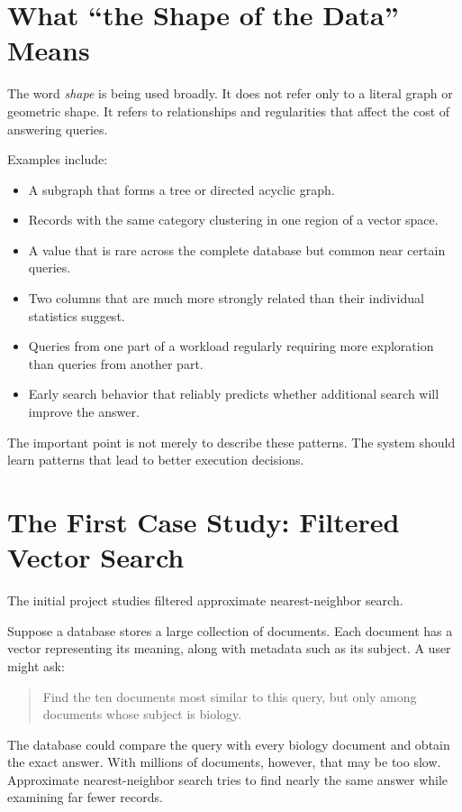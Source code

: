 \documentclass[11pt]{article}
\begin{document}
\section{What ``the Shape of the Data'' Means}

The word \emph{shape} is being used broadly. It does not refer only to a literal graph or geometric shape. It refers to relationships and regularities that affect the cost of answering queries.

Examples include:

\begin{itemize}
    \item A subgraph that forms a tree or directed acyclic graph.
    \item Records with the same category clustering in one region of a vector space.
    \item A value that is rare across the complete database but common near certain queries.
    \item Two columns that are much more strongly related than their individual statistics suggest.
    \item Queries from one part of a workload regularly requiring more exploration than queries from another part.
    \item Early search behavior that reliably predicts whether additional search will improve the answer.
\end{itemize}

The important point is not merely to describe these patterns. The system should learn patterns that lead to better execution decisions.

\section{The First Case Study: Filtered Vector Search}

The initial project studies filtered approximate nearest-neighbor search.

Suppose a database stores a large collection of documents. Each document has a vector representing its meaning, along with metadata such as its subject. A user might ask:

\begin{quote}
Find the ten documents most similar to this query, but only among documents whose subject is biology.
\end{quote}

The database could compare the query with every biology document and obtain the exact answer. With millions of documents, however, that may be too slow. Approximate nearest-neighbor search tries to find nearly the same answer while examining far fewer records.
\end{document}
